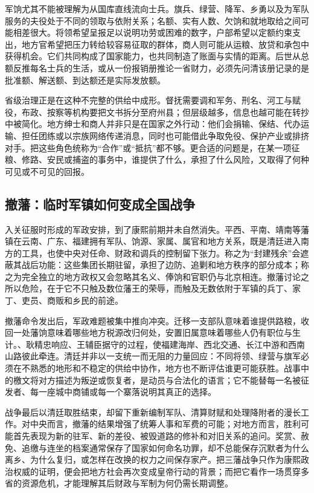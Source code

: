 军饷尤其不能被理解为从国库直线流向士兵。旗兵、绿营、降军、乡勇以及为军队服务的夫役处于不同的领取与依附关系；名额、实有人数、欠饷和就地取给之间可能相差很大。将领希望呈报足以说明功劳或困难的数字，户部希望以定额约束支出，地方官希望把压力转给较容易征取的群体，商人则可能从运粮、放贷和承包中获得机会。它们共同构成了国家能力，也共同制造了账面与实情的距离。后世从总额反推每名士兵的生活，或从一份报销册推论一省财力，必须先问清该册记录的是批准额、解送额、到达额还是实际发放额。

省级治理正是在这种不完整的供给中成形。督抚需要调和军务、刑名、河工与赋役，布政、按察等机构要把文书拆分至府州县；但层级越多，信息也越可能在转抄中被简化。地方绅士和商人并非只是在国家之外行动：他们会捐输、保结、代办运输、担任团练或以宗族网络传递消息，同时也可能借此争取免役、保护产业或排挤对手。把这些角色统称为“合作”或“抵抗”都不够。更合适的问题是，在某一项征粮、修路、安民或捕盗的事务中，谁提供了什么，承担了什么风险，又取得了何种可见或不可见的回报。

\subsection*{撤藩：临时军镇如何变成全国战争}
入关征服时形成的军政安排，到了康熙前期并未自然消失。平西、平南、靖南等藩镇在云南、广东、福建拥有军队、饷源、家属、属官和地方关系，既是清廷进入南方的工具，也使中央对任命、财政和调兵的控制留下张力。称之为“封建残余”会遮蔽其战后功能：这些集团长期驻留，承担了边防、追剿和地方秩序的部分成本；称之为完全独立的地方政权又会忽略其名义、俸饷和官职仍与北京相连。撤藩讨论之所以危险，在于它不只触及数位藩王的荣辱，而触及无数依附于军镇的兵丁、家丁、吏员、商贩和乡民的前途。

撤藩命令发出后，军政难题被集中推向冲突。迁移一支部队意味着谁提供路粮，收回一处藩饷意味着哪些地方税源改归何处，安置旧属意味着哪些人仍有职位与生计。、耿精忠响应、王辅臣据守的过程，使福建海岸、西北交通、长江中游和西南山路彼此牵连。清廷并非以一支统一而无阻的力量回应：不同将领、绿营与旗军必须在不熟悉的地形和不稳定的供给中协作，地方也不断评估谁更可能获胜。战事中的檄文将对方描述为叛逆或恢复者，是动员与合法化的语言；它不能替每一名被征发者、每一座城中商铺或每一个寨落说明其真正的选择。

战争最后以清廷取胜结束，却留下重新编制军队、清算财赋和处理降附者的漫长工作。对中央而言，撤藩的结果增强了统筹人事和军费的可能；对地方而言，胜利可能首先表现为新的驻军、新的差役、被毁道路的修补和对旧关系的追问。奖赏、赦免、追缴与连坐的档案通常保存了国家如何命名功罪，却不总能保存沉默者为什么离乡、为什么复归，或怎样在改换的权力之间保存家产。把三藩战争只作为康熙政治权威的证明，便会把地方社会再次变成皇帝行动的背景；而把它看作一场贯穿多省的资源危机，才能理解其后财政与军制为何仍需长期调整。

